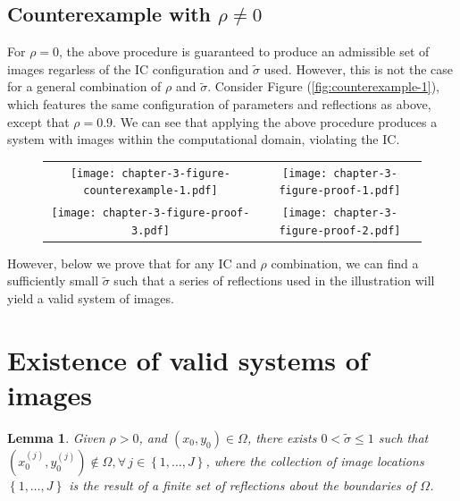 \documentclass[10pt]{article}
\newtheorem{lemma}{Lemma}
\begin{document}
\subsection{Counterexample with $\rho \neq 0$}
For $\rho=0$, the above procedure is guaranteed to produce an
admissible set of images regarless of the IC configuration and
$\tilde{\sigma}$ used. However, this is not the case for a general
combination of $\rho$ and $\tilde{\sigma}$. Consider Figure
(\ref{fig:counterexample-1}), which features the same configuration of
parameters and reflections as above, except that $\rho=0.9$. We can
see that applying the above procedure produces a system with images
within the computational domain, violating the IC.

\begin{figure}
  \begin{tabular}{cc}
    \begin{minipage}{0.50\textwidth}
      \centering
      \texttt{[image: chapter-3-figure-counterexample-1.pdf]}
      \caption{}
      \label{fig:counterexample-1}
    \end{minipage} &
    \begin{minipage}{0.50\textwidth}
      \centering
      \texttt{[image: chapter-3-figure-proof-1.pdf]}
      \caption{big $\sigma$}
      \label{fig:proof-1}
    \end{minipage} \\
    \begin{minipage}{0.50\textwidth}
      \centering
      \texttt{[image: chapter-3-figure-proof-3.pdf]}
      \caption{}
      \label{fig:proof-3}
    \end{minipage} &
        \begin{minipage}{0.50\textwidth}
      \centering
      \texttt{[image: chapter-3-figure-proof-2.pdf]}
      \caption{}
      \label{fig:proof-2}
    \end{minipage}
  \end{tabular}
\end{figure}
However, below we prove that for any IC and $\rho$ combination, we can
find a sufficiently small $\tilde{\sigma}$ such that a series of
reflections used in the illustration will yield a valid system of
images.

\section{Existence of valid systems of images}
\begin{lemma}
  Given $\rho > 0$, and $(x_0, y_0) \in \Omega$, there
  exists $0 < \tilde{\sigma} \leq 1$ such that
  $(x_0^{(j)}, y_0^{(j)}) \notin \Omega, \forall \, j\in
  \left\{1, \ldots, J\right\}$, where the collection of image
  locations $\left\{1, \ldots, J\right\}$ is the result of a finite
  set of reflections about the boundaries of $\Omega$.
\end{lemma}
\end{document}
